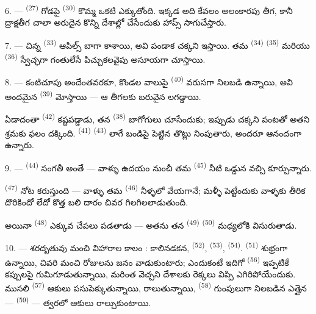 \VUsaut{6.0mm}
\VUsaut{3.4mm}

6. ---  \textsuperscript{(27)} గోడపై  \textsuperscript{(30)}
కొమ్మ ఒకటి ఎక్కుతోంది. ఇక్కడ అది కేవలం అలంకారపు తీగ, కానీ ద్రాక్షతీగ చాలా అరుదైన కొన్ని
దేశాల్లో  చేసేందుకు హాప్స్ సాగుచేస్తారు.

7. --- చిన్న  \textsuperscript{(33)} ఆపిల్స్ బాగా కాశాయి, అవి పండాక
చక్కని  ఇస్తాయి. తమ  \textsuperscript{(34)} 
\textsuperscript{(35)} మరియు  \textsuperscript{(36)} స్వేచ్ఛగా గంతులేసే
పిచ్చుకలవైపు అసూయగా చూస్తాయి.

8. --- కంటిచూపు అందేంతవరకూ, కొండల వాలుపై  \textsuperscript{(40)}
వరుసగా నిలబడి ఉన్నాయి, అవి అందమైన  \textsuperscript{(39)} మోస్తాయి — ఆ
తీగలకు బరువైన  లగడ్డాయి.

ఏడాదంతా  \textsuperscript{(42)} కష్టపడ్డాడు, తన 
\textsuperscript{(38)} బాగోగులు చూసేందుకు; ఇప్పుడు చక్కని పంటతో అతని శ్రమకు ఫలం దక్కింది.
 \textsuperscript{(41)} 
\textsuperscript{(43)} లాగే బండిపై పెట్టిన తొట్లు నింపుతారు, అందరూ ఆనందంగా ఉన్నారు.

\VUsaut{5.0mm}
\VUsaut{3.4mm}

9. ---  \textsuperscript{(44)} సంగతీ అంతే — వాళ్ళు ఉదయం నుంచీ తమ
 \textsuperscript{(45)} నీటి ఒడ్డున వచ్చి కూర్చున్నారు.

 \textsuperscript{(47)}  నోట కరుస్తుంది — వాళ్ళు తమ 
\textsuperscript{(46)} నీళ్ళలో వేయగానే;  మళ్ళీ పెట్టేందుకు వాళ్ళకు తీరిక దొరికిందో
లేదో కొత్త బలి దారం చివర గిలగిలలాడుతుంది.

అయినా  \textsuperscript{(48)} ఎక్కువ చేపలు పడతాడు — అతను తన
 \textsuperscript{(49)}  \textsuperscript{(50)} మధ్యలోకి
 విసురుతాడు.

10. --- శరదృతువు మంచి విహారాల కాలం : కాలినడకన,  \textsuperscript{(52)},
 \textsuperscript{(53)},  \textsuperscript{(54)}.
 \textsuperscript{(51)} శుభ్రంగా ఉన్నాయి, చివరి మంచి రోజులను జనం వాడుకుంటారు;
ఎందుకంటే ఇదిగో  \textsuperscript{(56)} ఇప్పటికే కప్పులపై
గుమిగూడుతున్నాయి, మరింత వెచ్చని దేశాలకు రెక్కలు విప్పి ఎగిరిపోయేందుకు. ముసలి
 \textsuperscript{(57)} ఆకులు పసుపెక్కుతున్నాయి, 
రాలుతున్నాయి,  \textsuperscript{(58)} గుంపులుగా నిలబడిన ఎత్తైన
 —  \textsuperscript{(59)} — త్వరలో ఆకులు రాల్చుకుంటాయి.

